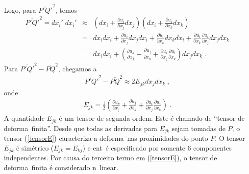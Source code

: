 Logo, para $\overline{P'Q'}^2$, temos
\begin{eqnarray}
\overline{P'Q'}^2 = dx_i' \; dx_i' &\approx & \left(dx_i +
\frac{\partial u_i}{\partial x_j} dx_j\right) \left(dx_i +
\frac{\partial u_i}{\partial x_k} dx_k\right) \\
&=& dx_i dx_i +  \frac{\partial u_i}{\partial x_j} dx_j
dx_i + \frac{\partial u_i}{\partial x_k} dx_k  dx_i
+ \frac{\partial u_i}{\partial x_k} \frac{\partial u_i}
{\partial x_j} dx_j dx_k \\
&=& dx_i dx_i + \left( \frac{\partial u_k}{\partial x_j} +
\frac{\partial u_j}{\partial x_k} + \frac{\partial u_i}
{\partial x_j} \frac{\partial u_i}{\partial x_k}\right)
dx_j dx_k \; .
\end{eqnarray}
Para $\overline{P'Q'}^2 - \overline{PQ}^2$, chegamos a
\begin{eqnarray}
\overline{P'Q'}^2 - \overline{PQ}^2 \approx 2 E_{jk}
dx_j dx_k \; ,
\end{eqnarray}
onde
\begin{eqnarray} \label{tensorE}
E_{jk} = \frac{1}{2} \left( \frac{\partial u_k}
{\partial x_j} + \frac{\partial u_j}{\partial x_k} +
\frac{\partial u_i}{\partial x_j} \frac{\partial u_i}
{\partial x_k}\right) \; .
\end{eqnarray}
A quantidade $E_{jk}$ \'e um tensor de segunda ordem.
Este \'e chamado de ``tensor de deforma\cao\ finita''.
Desde que todas as derivadas para $E_{jk}$ sejam tomadas
de $P$, o tensor (\ref{tensorE}) caracteriza a
deforma\cao\ nas proximidades do ponto $P$. O tensor
$E_{jk}$ \'e sim\'etrico ($E_{jk} = E_{kj}$) e ent\ao\ \'e
especificado por somente 6 componentes independentes. Por
causa do terceiro termo em (\ref{tensorE}), o tensor de
deforma\cao\ finita \'e considerado n\ao\ linear.


